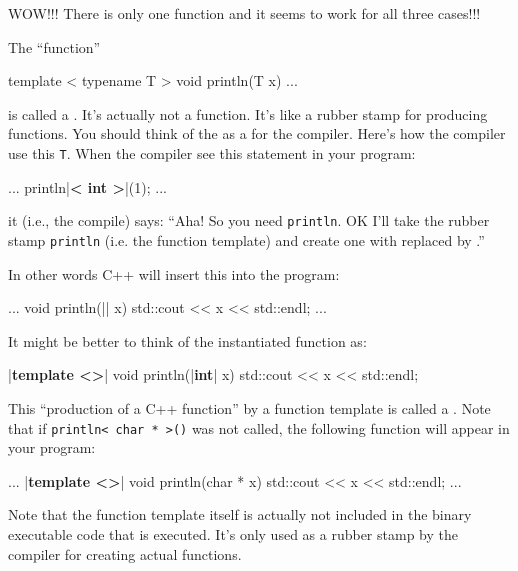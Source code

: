 WOW!!! There is only one function and it seems to work for all three
cases!!!

The ``function''

\begin{consolethree}[escapeinside=||]
template < typename T >
void println(T x)
{
    ...
}
\end{consolethree}

is called a . It's actually
not a function. It's like a rubber stamp for producing
functions. You should think of the  as a  for the compiler. Here's how the compiler use
this \texttt{T}. When the compiler see this statement in your program:

\begin{consolethree}[escapeinside=||]
...
println|\textbf{< int >}|(1);
...
\end{consolethree}

it (i.e., the compile) says: ``Aha! So you need
\texttt{println}.
OK I'll take the rubber stamp \texttt{println} (i.e. the
function template) and create one with  replaced by
.''

In other words C++ will insert this into the program:

\begin{consolethree}[escapeinside=||]
...
void println(|| x)
{
    std::cout << x << std::endl;
}
...
\end{consolethree}

It might be better to think of the instantiated function as:

\begin{consolethree}[escapeinside=||]
|\textbf{template <>}|
void println(|\textbf{int}| x)
{
    std::cout << x << std::endl;
}
\end{consolethree}

This ``production of a C++ function'' by a function template is called a
. Note that if
\texttt{println< char * >()} was not called, the
following function will  appear in your program:

\begin{consolethree}[escapeinside=||]
...
|\textbf{template <>}|
void println(char * x)
{
    std::cout << x << std::endl;
}
...
\end{consolethree}

Note that the function template itself is actually not included in the
binary executable code that is executed. It's only used
as a rubber stamp by the compiler for creating actual functions.

